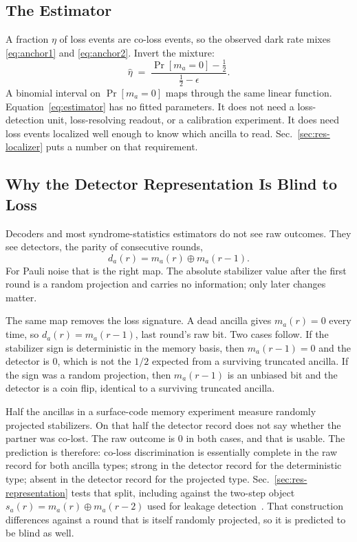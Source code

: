 \documentclass{ieeeaccess}
\begin{document}
\subsection{The Estimator}
\label{sec:theory-estimator}

A fraction $\eta$ of loss events are co-loss events, so the observed dark rate
mixes \eqref{eq:anchor1} and \eqref{eq:anchor2}. Invert the mixture:
\begin{equation}
  \hat\eta \;=\; \frac{\Pr[m_a=0] - \tfrac{1}{2}}{\tfrac{1}{2}-\epsilon}.
  \label{eq:estimator}
\end{equation}
A binomial interval on $\Pr[m_a=0]$ maps through the same linear function.
Equation~\eqref{eq:estimator} has no fitted parameters. It does not need a
loss-detection unit, loss-resolving readout, or a calibration experiment. It
does need loss events localized well enough to know which ancilla to read.
Sec.~\ref{sec:res-localizer} puts a number on that requirement.

\subsection{Why the Detector Representation Is Blind to Loss}
\label{sec:theory-detector}

Decoders and most syndrome-statistics estimators do not see raw outcomes.
They see detectors, the parity of consecutive rounds,
\begin{equation}
  d_a(r) = m_a(r) \oplus m_a(r-1).
  \label{eq:detector}
\end{equation}
For Pauli noise that is the right map. The absolute stabilizer value after
the first round is a random projection and carries no information; only later
changes matter.

The same map removes the loss signature. A dead ancilla gives $m_a(r)=0$
every time, so $d_a(r)=m_a(r-1)$, last round's raw bit. Two cases follow.
If the stabilizer sign is deterministic in the memory basis, then
$m_a(r-1)=0$ and the detector is $0$, which is not the $1/2$ expected from a
surviving truncated ancilla. If the sign was a random projection, then
$m_a(r-1)$ is an unbiased bit and the detector is a coin flip, identical to a
surviving truncated ancilla.

Half the ancillas in a surface-code memory experiment measure randomly
projected stabilizers. On that half the detector record does not say whether
the partner was co-lost. The raw outcome is $0$ in both cases, and that is
usable. The prediction is therefore: co-loss discrimination is essentially
complete in the raw record for both ancilla types; strong in the detector
record for the deterministic type; absent in the detector record for the
projected type. Sec.~\ref{sec:res-representation} tests that split, including
against the two-step object $s_a(r)=m_a(r)\oplus m_a(r-2)$ used for leakage
detection~\cite{bultink2020repetitiveparity,varbanov2020leakagedetection}.
That construction differences against a round that is itself randomly
projected, so it is predicted to be blind as well.
\end{document}
